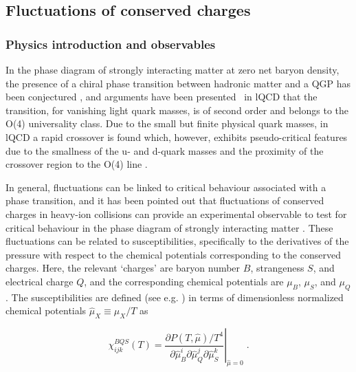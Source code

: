 \subsection{Fluctuations of conserved charges} 
\label{sec:fluctuations}
\subsubsection{Physics introduction and observables}

In the phase diagram of strongly interacting matter at zero net baryon density, the presence of a chiral phase transition between hadronic matter and a QGP has been conjectured \cite{Pisarski:1983ms}, and arguments have been presented~\cite{Ejiri:2009ac,Ding:2018auz} in lQCD that the transition, for vanishing light quark masses, is of second order and belongs to the O(4) universality class. Due to the small but finite physical quark masses, in lQCD a rapid crossover is found \cite{Aoki:2006we,Aoki:2009sc,Borsanyi:2010bp,Bazavov:2011nk,Bhattacharya:2014ara} which, however, exhibits pseudo-critical features due to the smallness of the u- and d-quark masses and the proximity of the crossover region to the O(4) line \cite{Ejiri:2009ac,Ding:2013lfa}. 

In general, fluctuations can be linked to critical behaviour associated with a phase transition, and it has been pointed out that fluctuations of conserved charges in heavy-ion collisions can provide an experimental observable to test for critical behaviour in the phase diagram of strongly interacting matter \cite{Ejiri:2005wq,Bazavov:2017dus,Friman:2011pf,Bazavov:2012jq}. These fluctuations can be related to susceptibilities, specifically to the derivatives of the pressure with respect to the chemical potentials corresponding to the conserved charges. Here, the relevant `charges' are baryon number $B$, strangeness $S$, and electrical charge $Q$, and the corresponding chemical potentials are $\mu_B$, $\mu_S$, and $\mu_Q$. The susceptibilities are defined (see e.g. \cite{Bazavov:2012jq,Bellwied:2015lba}) in terms of dimensionless normalized chemical potentials \(\hat{\mu}_X\equiv \mu_X/T \) \: as

\begin{equation}
\chi_{ijk}^{BQS}(T) = \left.
\frac{\partial P(T,\hat{\mu})/T^4}{\partial\hat{\mu}_B^i \partial\hat{\mu}_Q^j \partial\hat{\mu}_S^k}\right|_{\hat{\mu}=0} \; .
\label{suscept}
\end{equation} 


